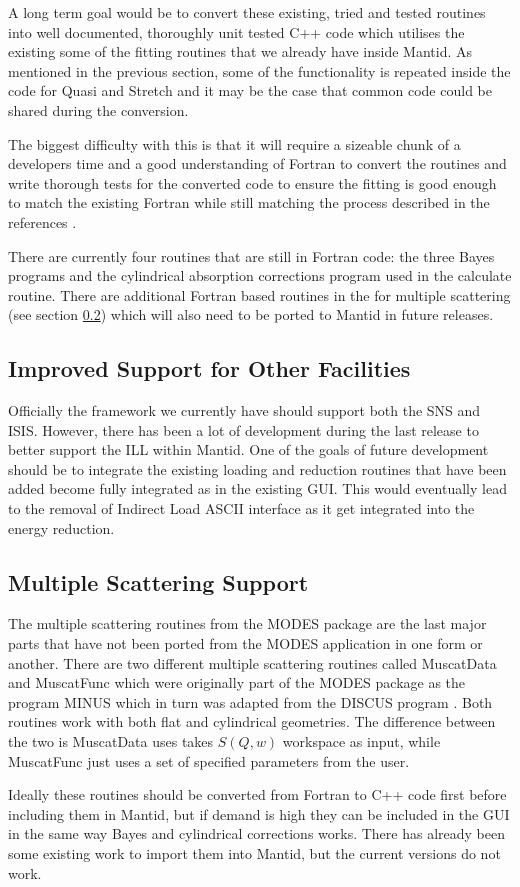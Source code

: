 \documentclass[paper=a4, fontsize=11pt]{scrartcl}	%
\numberwithin{equation}{section}															%
\numberwithin{figure}{section}																%
\numberwithin{table}{section}																%
\begin{document}
A long term goal would be to convert these existing, tried and tested routines into well documented, thoroughly unit tested C++ code which utilises the existing some of the fitting routines that we already have inside Mantid. As mentioned in the previous section, some of the functionality is repeated inside the code for Quasi and Stretch and it may be the case that common code could be shared during the conversion.

The biggest difficulty with this is that it will require a sizeable chunk of a developers time and a good understanding of Fortran to convert the routines and write thorough tests for the converted code to ensure the fitting is good enough to match the existing Fortran while still matching the process described in the references \cite{dssivia1992}.

There are currently four routines that are still in Fortran code: the three Bayes programs and the cylindrical absorption corrections program used in the calculate routine. There are additional Fortran based routines in the for multiple scattering (see section \ref{subsec:multiple-scattering}) which will also need to be ported to Mantid in future releases.

\subsection{Improved Support for Other Facilities}
Officially the framework we currently have should support both the SNS and ISIS. However, there has been a lot of development during the last release to better support the ILL within Mantid. One of the goals of future development should be to integrate the existing loading and reduction routines that have been added become fully integrated as in the existing GUI. This would eventually lead to the removal of Indirect Load ASCII interface as it get integrated into the energy reduction.

\subsection{Multiple Scattering Support}
\label{subsec:multiple-scattering}
The multiple scattering routines from the MODES package are the last major parts that have not been ported from the MODES application in one form or another. There are two different multiple scattering routines called MuscatData and MuscatFunc which were originally part of the MODES package as the program MINUS which in turn was adapted from the DISCUS program \cite{wshowells2010}\cite{mjohnson1974}. Both routines work with both flat and cylindrical geometries. The difference between the two is MuscatData uses takes $S(Q,w)$ workspace as input, while MuscatFunc just uses a set of specified parameters from the user. 

Ideally these routines should be converted from Fortran to C++ code first before including them in Mantid, but if demand is high they can be included in the GUI in the same way Bayes and cylindrical corrections works. There has already been some existing work to import them into Mantid, but the current versions do not work.



\end{document}
